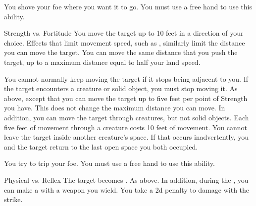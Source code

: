            \label{Shove} You shove your foe where you want it to go.
            You must use a free hand to use this ability.
            \begin{ability}
                \begin{spelltargetinginfo}
                \end{spelltargetinginfo}
                \begin{spelleffects}
                    \begin{spellattack}{Strength vs. Fortitude}
                        \spellsuccess You move the target up to 10 feet in a direction of your choice.
                        Effects that limit movement speed, such as , similarly limit the distance you can move the target.
                        You can move the same distance that you push the target, up to a maximum distance equal to half your land speed.

                        You cannot normally keep moving the target if it stops being adjacent to you.
                        If the target encounters a creature or solid object, you must stop moving it.
                        \spellcritical As above, except that you can move the target up to five feet per point of Strength you have.
                        This does not change the maximum distance you can move.
                        In addition, you can move the target through creatures, but not solid objects.
                        Each five feet of movement through a creature costs 10 feet of movement.
                        You cannot leave the target inside another creature's space.
                        If that occurs inadvertently, you and the target return to the last open space you both occupied.
                    \end{spellattack}
                \end{spelleffects}
            \end{ability}

            \label{Trip} You try to trip your foe.
            You must use a free hand to use this ability.
            \begin{ability}
                \begin{spelltargetinginfo}
                \end{spelltargetinginfo}
                \begin{spelleffects}
                    \begin{spellattack}{Physical vs. Reflex}
                        \spellsuccess The target becomes \prone.
                        \spellcritical As above. In addition, during the , you can make a  with a weapon you wield.
                        You take a \minus2d penalty to damage with the strike.
                    \end{spellattack}
                \end{spelleffects}
            \end{ability}

